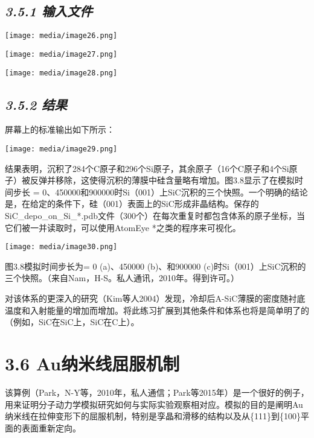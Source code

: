 \documentclass[
]{article}
\begin{document}
\hypertarget{ux8f93ux5165ux6587ux4ef6-3}{%
\subsection{\texorpdfstring{\emph{3.5.1
输入文件}}{3.5.1 输入文件}}\label{ux8f93ux5165ux6587ux4ef6-3}}

\texttt{[image: media/image26.png]}

\texttt{[image: media/image27.png]}

\texttt{[image: media/image28.png]}

\hypertarget{ux7ed3ux679c-4}{%
\subsection{\texorpdfstring{\emph{3.5.2
结果}}{3.5.2 结果}}\label{ux7ed3ux679c-4}}

屏幕上的标准输出如下所示：

\texttt{[image: media/image29.png]}

结果表明，沉积了284个C原子和296个Si原子，其余原子（16个C原子和4个Si原子）被反弹并移除，这使得沉积的薄膜中硅含量略有增加。图3.8显示了在模拟时间步长
=
0、450000和900000时Si（001）上SiC沉积的三个快照。一个明确的结论是，在给定的条件下，硅（001）表面上的SiC形成非晶结构。保存的SiC\_depo\_on\_Si\_*.pdb文件（300个）在每次重复时都包含体系的原子坐标，当它们被一并读取时，可以使用AtomEye
*之类的程序来可视化。

\texttt{[image: media/image30.png]}

图3.8模拟时间步长为= 0 (a)、450000 (b)、和900000
(c)时Si（001）上SiC沉积的三个快照。（来自Nam，H-S。私人通讯，2010年。得到许可。）

对该体系的更深入的研究（Kim等人2004）发现，冷却后A-SiC薄膜的密度随衬底温度和入射能量的增加而增加。将此练习扩展到其他条件和体系也将是简单明了的（例如，SiC在SiC上，SiC在C上）。

\hypertarget{auux7eb3ux7c73ux7ebfux5c48ux670dux673aux5236}{%
\section{3.6
Au纳米线屈服机制}\label{auux7eb3ux7c73ux7ebfux5c48ux670dux673aux5236}}

该算例（Park，N-Y等，2010年，私人通信；Park等2015年）是一个很好的例子，用来证明分子动力学模拟研究如何与实际实验观察相对应。模拟的目的是阐明Au纳米线在拉伸变形下的屈服机制，特别是孪晶和滑移的结构以及从\{111\}到\{100\}平面的表面重新定向。
\end{document}
